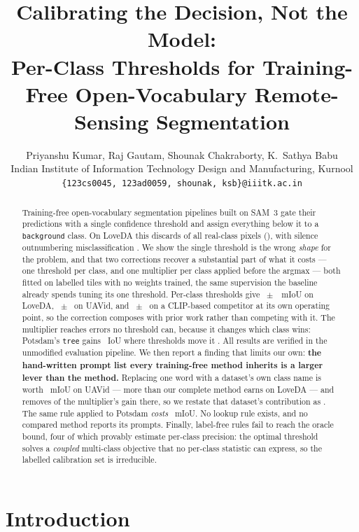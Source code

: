\documentclass[10pt,twocolumn,letterpaper]{article}          %
\title{Calibrating the Decision, Not the Model:\\
       Per-Class Thresholds for Training-Free Open-Vocabulary
       Remote-Sensing Segmentation}
\author{%
  Priyanshu Kumar, \quad Raj Gautam, \quad Shounak Chakraborty, \quad K.~Sathya Babu\\[2pt]
  Indian Institute of Information Technology Design and Manufacturing, Kurnool\\
  \texttt{\{123cs0045, 123ad0059, shounak, ksb\}@iiitk.ac.in}%
}
\date{}
\newcommand{\best}[1]{\textbf{#1}}
\newcommand{\bg}{\texttt{background}}
\begin{document}
\maketitle

\begin{abstract}
Training-free open-vocabulary segmentation pipelines built on SAM~3 gate their
predictions with a single confidence threshold and assign everything below it to a
\bg{} class. On LoveDA this discards \discardPct{} of all real-class pixels
(\discardPx{}), with silence outnumbering misclassification \discardRatio{}. We show
the single threshold is the wrong \emph{shape} for the problem, and that two
corrections recover a substantial part of what it costs --- one threshold per class,
and one multiplier per class applied before the argmax --- both fitted on
\calibTiles{} labelled tiles with no weights trained, the same supervision the
baseline already spends tuning its one threshold. Per-class thresholds give
\methodGain{}~$\pm$~\methodSD{}~mIoU on LoveDA, \uavTauCV{}~$\pm$~\uavTauSD{} on
UAVid, and \cnCV{}~$\pm$~\cnCVsd{} on a CLIP-based competitor at its own operating
point, so the correction composes with prior work rather than competing with it. The
multiplier reaches errors no threshold can, because it changes which class wins:
Potsdam's \texttt{tree} gains \treeScale{}~IoU where thresholds move it \treeTau{}.
All results are verified in the unmodified evaluation pipeline. We then report a
finding that limits our own: \best{the hand-written prompt list every training-free
method inherits is a larger lever than the method.} Replacing one word with a
dataset's own class name is worth \vocUavGain{}~mIoU on UAVid --- more than our
complete method earns on LoveDA --- and removes \uavScaleLost{} of the multiplier's
gain there, so we restate that dataset's contribution as \uavCorrMethod{}. The same
rule applied to Potsdam \emph{costs} \vocPotsGain{}~mIoU. No lookup rule exists, and
no compared method reports its prompts. Finally, \nAttempts{} label-free rules fail
to reach the oracle bound, four of which provably estimate per-class precision: the
optimal threshold solves a \emph{coupled} multi-class objective that no per-class
statistic can express, so the labelled calibration set is irreducible.
\end{abstract}

\section{Introduction}
\label{sec:intro}
\end{document}
